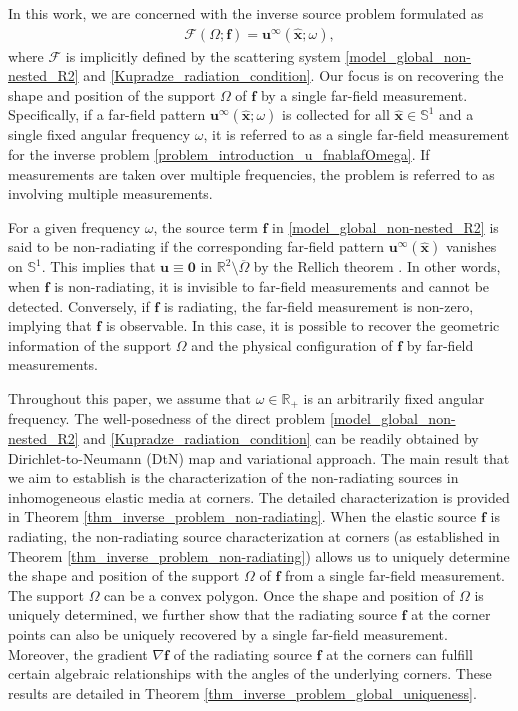 \documentclass[11pt,reqno,oneside]{amsart}
\theoremstyle{definition}
\theoremstyle{remark}
\numberwithin{equation}{section}
\numberwithin{equation}{section}
\theoremstyle{remark}
\begin{document}
In this work, we are concerned with the inverse source problem formulated as 
\begin{align} \label{problem_introduction_u_fnablafOmega}
	\mathcal{F}\left(\Omega; \mathbf{f}\right) = \mathbf{u}^{\infty} \left(\hat{\mathbf{x}};\omega\right),
\end{align}
where $ \mathcal{F} $ is implicitly defined by the scattering system \eqref{model_global_non-nested_R2} and \eqref{Kupradze_radiation_condition}. Our focus is on recovering the shape and position of the support $ \Omega $ of  $ \mathbf{f} $ by a single far-field measurement. Specifically, if a far-field pattern $ \mathbf{u}^{\infty} \left(\hat{\mathbf{x}};\omega\right) $ is collected for all $ \hat{\mathbf{x}}\in\mathbb{S}^1 $ and a single fixed angular frequency $ \omega $, it is referred to as a single far-field measurement for the inverse problem \eqref{problem_introduction_u_fnablafOmega}. If measurements are taken over multiple frequencies, the problem is referred to as involving multiple measurements.  

For a given frequency  $ \omega $, the source term $ \mathbf{f} $ in \eqref{model_global_non-nested_R2} is said to be non-radiating if the  corresponding far-field pattern $ \mathbf{u}^{\infty}\left(\hat{\mathbf{x}}\right) $ vanishes on $\mathbb S^1$. This implies that $\mathbf u \equiv \mathbf 0$ in $\mathbb R^2  \setminus \overline \Omega$ by the Rellich theorem \cite{hahner1998acoustic}.  In other words, when $\mathbf f$  is non-radiating, it is invisible to far-field measurements and cannot be detected. Conversely, if $\mathbf f$ is radiating, the far-field measurement is non-zero, implying that $\mathbf f$ is observable. In this case, it is possible to recover the geometric information of the support  $\Omega$ and the physical configuration of $\mathbf f$ by far-field measurements. 

Throughout this paper, we assume that $ \omega\in \mathbb R_+ $ is an arbitrarily fixed angular frequency. The well-posedness of the direct problem \eqref{model_global_non-nested_R2} and \eqref{Kupradze_radiation_condition} can be readily obtained by Dirichlet-to-Neumann (DtN) map and variational approach. The main result that we aim to establish is the characterization of the non-radiating sources in inhomogeneous elastic media at corners. The detailed characterization is provided in Theorem \ref{thm_inverse_problem_non-radiating}. When the elastic source $\mathbf f$ is radiating, the non-radiating source characterization at corners (as established in Theorem \ref{thm_inverse_problem_non-radiating}) allows us to uniquely determine the shape and position of the support  $\Omega$ of $\mathbf f$ from a single far-field measurement. The support $\Omega$ can be a convex polygon. Once the shape and position of $\Omega$ is uniquely determined, we further show that the radiating source $ \mathbf{f} $  at the corner points can also be uniquely recovered by a single far-field measurement. Moreover,  the gradient $ \nabla\mathbf{f} $ of the radiating source $ \mathbf{f} $ at the corners can fulfill certain algebraic relationships with the angles of the underlying corners. These results are detailed in Theorem \ref{thm_inverse_problem_global_uniqueness}.
\end{document}
